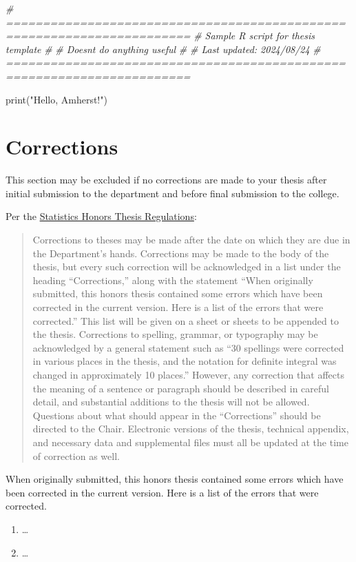 \documentclass[
  11pt,
  letterpaper,
  twoside]{report}
\newenvironment{Shaded}{}{}
\newcommand{\CommentTok}[1]{\textcolor[rgb]{0.63,0.63,0.65}{\textit{#1}}}
\newcommand{\FunctionTok}[1]{\textcolor[rgb]{0.25,0.47,0.95}{#1}}
\newcommand{\NormalTok}[1]{\textcolor[rgb]{0.22,0.23,0.26}{#1}}
\newcommand{\StringTok}[1]{\textcolor[rgb]{0.31,0.63,0.31}{#1}}
\providecommand{\tightlist}{%
  \setlength{\itemsep}{0pt}\setlength{\parskip}{0pt}}\usepackage{longtable,booktabs,array}
\begin{document}
\begin{Shaded}
\begin{Highlighting}[numbers=left,,]
\CommentTok{\# =======================================================================}
\CommentTok{\# Sample R script for thesis template}
\CommentTok{\#}
\CommentTok{\# Doesn\textquotesingle{}t do anything useful}
\CommentTok{\#}
\CommentTok{\# Last updated: 2024/08/24}
\CommentTok{\# =======================================================================}

\FunctionTok{print}\NormalTok{(}\StringTok{"Hello, Amherst!"}\NormalTok{)}
\end{Highlighting}
\end{Shaded}

\chapter{Corrections}\label{sec-corrections}

This section may be excluded if no corrections are made to your thesis
after initial submission to the department and before final submission
to the college.

Per the
\href{https://www.amherst.edu/academiclife/departments/mathematics-statistics/major-in-statistics/honors-in-statistics/thesis-regulations}{Statistics
Honors Thesis Regulations}:

\begin{quote}
Corrections to theses may be made after the date on which they are due
in the Department's hands. Corrections may be made to the body of the
thesis, but every such correction will be acknowledged in a list under
the heading ``Corrections,'' along with the statement ``When originally
submitted, this honors thesis contained some errors which have been
corrected in the current version. Here is a list of the errors that were
corrected.'' This list will be given on a sheet or sheets to be appended
to the thesis. Corrections to spelling, grammar, or typography may be
acknowledged by a general statement such as ``30 spellings were
corrected in various places in the thesis, and the notation for definite
integral was changed in approximately 10 places.'' However, any
correction that affects the meaning of a sentence or paragraph should be
described in careful detail, and substantial additions to the thesis
will not be allowed. Questions about what should appear in the
``Corrections'' should be directed to the Chair. Electronic versions of
the thesis, technical appendix, and necessary data and supplemental
files must all be updated at the time of correction as well.
\end{quote}

When originally submitted, this honors thesis contained some errors
which have been corrected in the current version. Here is a list of the
errors that were corrected.

\begin{enumerate}
\def\labelenumi{\arabic{enumi}.}
\tightlist
\item
  \ldots{}
\item
  \ldots{}
\end{enumerate}
\end{document}
